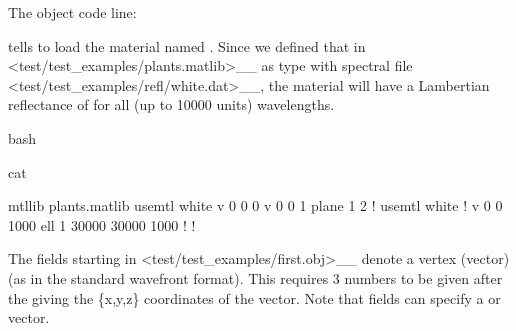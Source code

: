 \documentclass[letterpaper,10pt,english]{sphinxmanual}
\begin{document}
The object code line:

\begin{sphinxVerbatim}[commandchars=\\\{\}]
 
\end{sphinxVerbatim}

tells  to load the material named . Since we defined that in  \textless{}test/test\_examples/plants.matlib\textgreater{}\textasciigrave{}\_\_ as type  with spectral file  \textless{}test/test\_examples/refl/white.dat\textgreater{}\textasciigrave{}\_\_, the material will have a Lambertian reflectance of  for all (up to 10000 units) wavelengths.

{
\begin{sphinxVerbatim}[commandchars=\\\{\}]
\llap{\color{nbsphinxin}[ ]:\,\hspace{\fboxrule}\hspace{\fboxsep}}\PYGZpc{}\PYGZpc{}bash

cat 
\end{sphinxVerbatim}
}

\begin{sphinxVerbatim}[commandchars=\\\{\}]
mtllib plants.matlib
usemtl white
v 0 0 0
v 0 0 1
plane \PYGZhy{}1 \PYGZhy{}2
!\PYGZob{}
usemtl white
!\PYGZob{}
v 0 0 1000
ell \PYGZhy{}1 30000 30000 1000
!\PYGZcb{}
!\PYGZcb{}
\end{sphinxVerbatim}

The fields starting  in  \textless{}test/test\_examples/first.obj\textgreater{}\textasciigrave{}\_\_ denote a vertex (vector) (as in the standard wavefront format). This requires 3 numbers to be given after the  giving the \{x,y,z\} coordinates of the vector. Note that  fields can specify a  or  vector.
\end{document}
